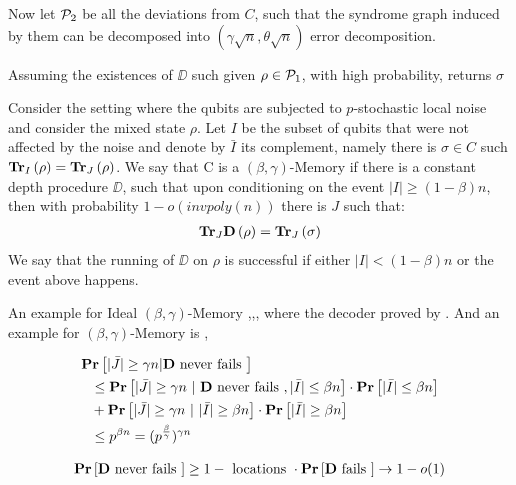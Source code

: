 \documentclass[manuscript,screen,review]{acmart}
\begin{document}
{ Now let $\mathcal{P}_{2}$ be all the deviations from $C$, such that the syndrome graph induced by them can be decomposed into $\left(\gamma \sqrt{n}, \theta \sqrt{n}\right)$ error decomposition. 

 Assuming the existences of $\DD$ such given $\rho \in \mathcal{P}_{1}$, with high probability, returns $\sigma $ 

 \begin{definition}
   Consider the setting where the qubits are subjected to $p$-stochastic local noise and consider the mixed state $\rho$. Let $I$ be the subset of qubits that were not affected by the noise and denote by $\bar{I}$ its complement, namely there is $\sigma \in C$ such $\mathbf{Tr}_I \left(\rho \right) = \mathbf{Tr}_J \left(\rho \right)$. We say that C is a $(\beta, \gamma)$-Memory if there is a constant depth procedure $\DD$, such that upon conditioning on the event $|I| \ge (1-\beta)n$, then with probability $1 - o(invpoly(n))$ there is $J$ such that:
   \begin{equation*}
     \begin{split}
       \mathbf{Tr}_{J}\mathbf{D} \left(\rho\right) =  \mathbf{Tr}_{J}\left(\sigma\right) 
     \end{split}
   \end{equation*}
We say that the running of $\DD$ on $\rho$ is successful if either $|I| < (1 - \beta) n$ or the event above happens.
 \end{definition}

 An example for Ideal $(\beta,\gamma)$-Memory \cite{leverrier2022quantum},\cite{Dinur},\cite{Pavel}, where the decoder proved by \cite{Gu_2024}. And an example for $\left( \beta,\gamma \right)$-Memory is \cite{Leverrier_2015}, \cite{Tillich_2014}

 \begin{equation*}
   \begin{split}
    & \mathbf{Pr} \left[ |\bar{J}|  \ge \gamma n | \mathbf{D} \text{ never fails }  \right] \\
      & \ \ \le  \mathbf{Pr} \left[ |\bar{J}| \ge \gamma n \ | \ \mathbf{D} \text{ never fails } , |\bar{I}| \le \beta n  \right] \cdot \mathbf{Pr} \left[ |\bar{I}| \le \beta n \right]  \\
     & \ \ + \mathbf{Pr} \left[ |\bar{J}| \ge \gamma n \ | \ |\bar{I}| \ge \beta n  \right] \cdot  \mathbf{Pr} \left[ |\bar{I}| \ge \beta n \right] \\ 
     & \ \ \le  p^{\beta n} = (p^\frac{\beta}{\gamma})^{\gamma n}
   \end{split}
 \end{equation*}


 \begin{equation*}
   \begin{split}
     \mathbf{Pr} \left[  \mathbf{D} \text{ never fails  }  \right] \ge 1 -  \text{  locations   } \cdot  \mathbf{Pr} \left[  \mathbf{D} \text{ fails  }  \right] \rightarrow 1 - o(1)
   \end{split}
 \end{equation*}








}
\end{document}
